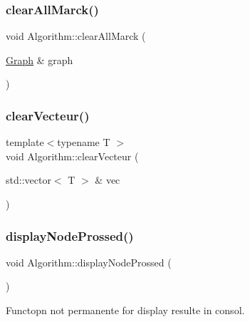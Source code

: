 \mbox{\label{struct_algorithm_ae9a908eaca25badea660fc00644e66a3}} 
\subsubsection{\texorpdfstring{clear\+All\+Marck()}{clearAllMarck()}\hspace{0.1cm}{\footnotesize\ttfamily [2/2]}}
{\footnotesize\ttfamily void Algorithm\+::clear\+All\+Marck (\begin{DoxyParamCaption}\item[{\mbox{\hyperlink{class_graph}{Graph}} \&}]{graph }\end{DoxyParamCaption})}

\mbox{\label{struct_algorithm_a929117c2d005410de6883ad36330328b}} 
\subsubsection{\texorpdfstring{clear\+Vecteur()}{clearVecteur()}}
{\footnotesize\ttfamily template$<$typename T $>$ \\
void Algorithm\+::clear\+Vecteur (\begin{DoxyParamCaption}\item[{std\+::vector$<$ T $>$ \&}]{vec }\end{DoxyParamCaption})}

\mbox{\label{struct_algorithm_a471cce04cc5a3fb74800171c0de76f3d}} 
\subsubsection{\texorpdfstring{display\+Node\+Prossed()}{displayNodeProssed()}}
{\footnotesize\ttfamily void Algorithm\+::display\+Node\+Prossed (\begin{DoxyParamCaption}{ }\end{DoxyParamCaption})}



Functopn not permanente for display resulte in consol. 


